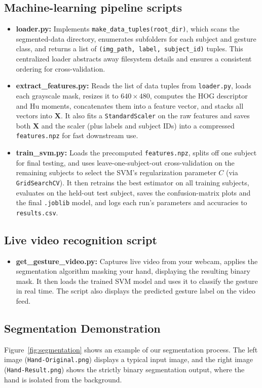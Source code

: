 \documentclass{article}
\begin{document}
\subsection{Machine-learning pipeline scripts}
\begin{itemize}
    \item \textbf{loader.py:} Implements \texttt{make\_data\_tuples(root\_dir)}, which scans the segmented-data directory, enumerates subfolders for each subject and gesture class, and returns a list of \texttt{(img\_path, label, subject\_id)} tuples. This centralized loader abstracts away filesystem details and ensures a consistent ordering for cross-validation.
    \item \textbf{extract\_features.py:} Reads the list of data tuples from \texttt{loader.py}, loads each grayscale mask, resizes it to \(640\times480\), computes the HOG descriptor and Hu moments, concatenates them into a feature vector, and stacks all vectors into \(\mathbf{X}\). It also fits a \texttt{StandardScaler} on the raw features and saves both \(\mathbf{X}\) and the scaler (plus labels and subject IDs) into a compressed \texttt{features.npz} for fast downstream use.
    \item \textbf{train\_svm.py:} Loads the precomputed \texttt{features.npz}, splits off one subject for final testing, and uses leave-one-subject-out cross-validation on the remaining subjects to select the SVM's regularization parameter \(C\) (via \texttt{GridSearchCV}). It then retrains the best estimator on all training subjects, evaluates on the held-out test subject, saves the confusion-matrix plots and the final \texttt{.joblib} model, and logs each run's parameters and accuracies to \texttt{results.csv}.
\end{itemize}
\subsection{Live video recognition script}
\begin{itemize}
    \item \textbf{get\_gesture\_video.py:} Captures live video from your webcam, applies the segmentation algorithm masking your hand, displaying the resulting binary mask. It then loads the trained SVM model and uses it to classify the gesture in real time. The script also displays the predicted gesture label on the video feed.
\end{itemize}



\subsection{Segmentation Demonstration}
Figure~\ref{fig:segmentation} shows an example of our segmentation process. The left image (\texttt{Hand-Original.png}) displays a typical input image, and the right image (\texttt{Hand-Result.png}) shows the strictly binary segmentation output, where the hand is isolated from the background.
\end{document}
